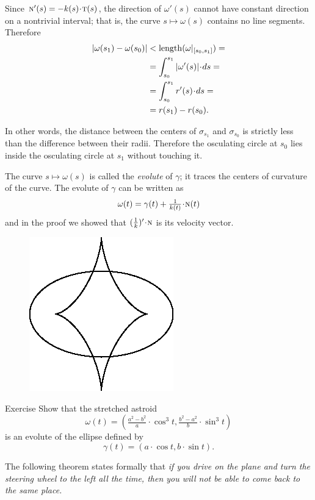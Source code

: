 Since $\norm'(s)=-\skur(s)\cdot\tan(s)$, the direction of $\omega'(s)$ cannot have constant direction on a nontrivial interval;
that is, the curve $s\mapsto \omega(s)$ contains no line segments.
Therefore 
\begin{align*}
|\omega(s_1)-\omega(s_0)|&<\length(\omega|_{[s_0,s_1]})=
\\
&=\int_{s_0}^{s_1}|\omega'(s)|\cdot ds=
\\
&=\int_{s_0}^{s_1}r'(s)\cdot ds=
\\
&=r(s_1)-r(s_0).
\end{align*}

In other words, the distance between the centers of $\sigma_{s_1}$ and $\sigma_{s_0}$
is strictly less than the difference between their radii.
Therefore the osculating circle at $s_0$ lies inside the osculating circle at $s_1$ without touching it.
\qeds

The curve $s\mapsto \omega(s)$ is called the \emph{evolute} of $\gamma$; 
it traces the centers of curvature of the curve. 
The evolute of $\gamma$ can be written as 
\[\omega(t)=\gamma(t)+\tfrac1{\skur(t)}\cdot \norm(t)\] and  
in the proof we showed that $(\tfrac1{\skur})'\cdot\norm$ is its velocity vector.

{

\begin{figure}
\vskip-0mm
\centering
\includegraphics{asy/ellipse-astroid}
\vskip-0mm
\end{figure}

\begin{thm}{Exercise}\label{ex:evolute-of-ellipse}
Show that the stretched astroid 
\[\omega(t)=(\tfrac{a^2-b^2}{a}\cdot \cos^3 t,  \tfrac{b^2-a^2}{b}\cdot\sin^3 t)\]
is an evolute of the ellipse defined by
\[\gamma(t)= (a\cdot \cos t, b\cdot\sin t).\]
\end{thm}

The following theorem states formally that 
\emph{if you drive on the plane and turn the steering wheel to the left all the time,
then you will not be able to come back to the same place.}

}

